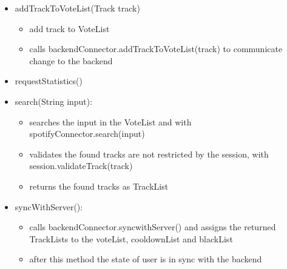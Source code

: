 \documentclass[oneside, nenglish]{sdqtechreport}
\begin{document}
\begin{itemize}
    \item addTrackToVoteList(Track track)
    \begin{itemize}
        \item add track to VoteList
        \item calls backendConnector.addTrackToVoteList(track) to communicate change to the backend
    \end{itemize}
    \item requestStatistics()

    \item search(String input):
    \begin{itemize}
        \item searches the input in the VoteList and with spotifyConnector.search(input)
        \item validates the found tracks are not restricted by the session, with session.validateTrack(track)
        \item returns the found tracks as TrackList 
    \end{itemize}

    \item syncWithServer():
    \begin{itemize}
        \item calls backendConnector.syncwithServer() and assigns the returned TrackLists to the voteList, cooldownList and blackList
        \item after this method the state of user is in sync with the backend
    \end{itemize}
    
\end{itemize}
\end{document}
